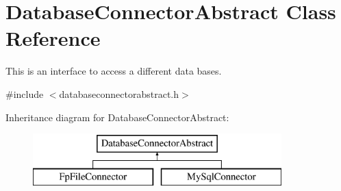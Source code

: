 \hypertarget{classDatabaseConnectorAbstract}{}\section{Database\+Connector\+Abstract Class Reference}
\label{classDatabaseConnectorAbstract}


This is an interface to access a different data bases.  




{\ttfamily \#include $<$databaseconnectorabstract.\+h$>$}

Inheritance diagram for Database\+Connector\+Abstract\+:\begin{figure}[H]
\begin{center}
\leavevmode
\includegraphics[height=2.000000cm]{classDatabaseConnectorAbstract}
\end{center}
\end{figure}
